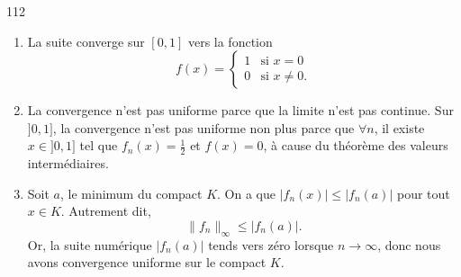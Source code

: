

\begin{corrige}{112}

%

\begin{enumerate}
\item La suite converge sur $[0,1]$ vers la fonction
\begin{equation}
	f(x)=
\begin{cases}
	1	&	\text{si $x=0$}\\
	0	&	 \text{si $x\neq 0$}.
\end{cases}
\end{equation}

\item La convergence n'est pas uniforme parce que la limite n'est pas continue. Sur $]0,1]$, la convergence n'est pas uniforme non plus parce que $\forall n$, il existe $x\in]0,1]$ tel que $f_n(x)=\frac{ 1 }{2}$ et $f(x)=0$, à cause du théorème des valeurs intermédiaires.

\item Soit $a$, le minimum du compact $K$. On a que $| f_n(x) |\leq | f_n(a) |$ pour tout $x\in K$. Autrement dit,
\begin{equation}
	\| f_n \|_{\infty}\leq | f_n(a) |.
\end{equation}
Or, la suite numérique $| f_n(a) |$ tends vers zéro lorsque $n\to\infty$, donc nous avons convergence uniforme sur le compact $K$.
\end{enumerate}
\end{corrige}
